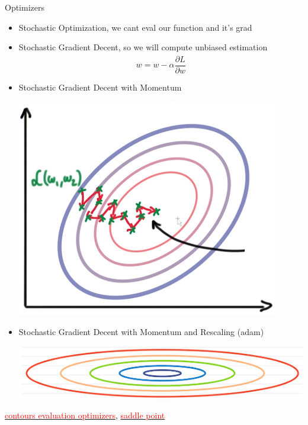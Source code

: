 \documentclass{beamer}
\begin{document}
\begin{frame}{Optimizers}

	\begin{itemize}
		\item   Stochastic Optimization, we cant eval our function and it's grad
		\item   Stochastic Gradient Decent, so we will compute unbiased estimation
		$$w = w - \alpha \frac{\partial \hat{L}}{\partial w}$$
		\item   Stochastic Gradient Decent with Momentum
			\begin{center}
				\includegraphics[scale=0.2]{img/mom}
			\end{center} 
		\item    Stochastic Gradient Decent with Momentum and Rescaling (adam)
			\begin{center}
				  \includegraphics[scale=0.2]{img/bs}
			\end{center} 
		
	\end{itemize}
	  \href{http://sebastianruder.com/content/images/2016/09/contours_evaluation_optimizers.gif}{\textcolor{red}{contours evaluation optimizers}}, 
	\href{http://sebastianruder.com/content/images/2016/09/saddle_point_evaluation_optimizers.gif}{\textcolor{red}{saddle point}}
	
\end{frame}
\end{document}
